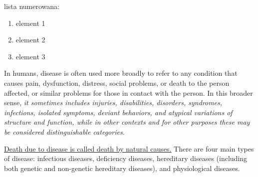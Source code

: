 lista numerowana:
\begin{enumerate}
  \item element 1
  \item element 2
  \item element 3
\end{enumerate}
\vspace{2 cm}
\par
\begin{flushleft}
In humans, disease is often used more broadly to refer to any condition that causes pain, dysfunction, distress, social problems, or death to the person affected, or similar problems for those in contact with the person. In this broader sense, \emph{it sometimes includes injuries, disabilities, disorders, syndromes, infections, isolated symptoms, deviant behaviors, and atypical variations of structure and function, while in other contexts and for other purposes these may be considered distinguishable categories.}
\end{flushleft}
\begin{flushright}
\par
\underline{Death due to disease is called death by natural causes.} There are four main types of disease: infectious diseases, deficiency diseases, hereditary diseases (including both genetic and non-genetic hereditary diseases), and physiological diseases.
\end{flushright}

